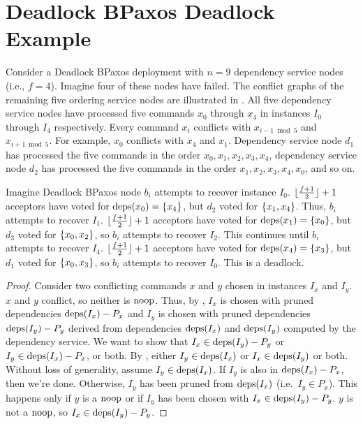 \section{Deadlock BPaxos Deadlock Example}
Consider a Deadlock BPaxos deployment with $n = 9$ dependency service nodes
(i.e., $f = 4$). Imagine four of these nodes have failed. The conflict graphs
of the remaining five ordering service nodes are illustrated in
. All five dependency service nodes have
processed five commands $x_0$ through $x_4$ in instances $I_0$ through $I_4$
respectively. Every command $x_i$ conflicts with $x_{i - 1 \bmod 5}$ and $x_{i
+ 1 \bmod 5}$. For example, $x_0$ conflicts with $x_4$ and $x_1$. Dependency
service node $d_1$ has processed the five commands in the order $x_0, x_1, x_2,
x_3, x_4$, dependency service node $d_2$ has processed the five commands in the
order $x_1, x_2, x_3, x_4, x_0$, and so on.

{}

Imagine Deadlock BPaxos node $b_i$ attempts to recover instance $I_0$.
$\lfloor\frac{f + 1}{2}\rfloor + 1$ acceptors have voted for $\text{deps}(x_0) = \{x_4\}$, but
$d_2$ voted for $\{x_1, x_4\}$. Thus, $b_i$ attempts to recover $I_1$.
$\lfloor\frac{f + 1}{2}\rfloor + 1$ acceptors have voted for $\text{deps}(x_1) = \{x_0\}$, but
$d_3$ voted for $\{x_0, x_2\}$, so $b_i$ attempts to recover $I_2$. This
continues until $b_i$ attempts to recover $I_4$.  $\lfloor\frac{f + 1}{2}\rfloor + 1$
acceptors have voted for $\text{deps}(x_4) = \{x_3\}$, but $d_1$ voted for
$\{x_0, x_3\}$, so $b_i$ attempts to recover $I_0$. This is a deadlock.


\begin{proof}
  Consider two conflicting commands $x$ and $y$ chosen in instances $I_x$ and
  $I_y$. $x$ and $y$ conflict, so neither is $\text{noop}$. Thus, by
  , $I_x$ is chosen with pruned dependencies
  $\text{deps}(I_x) - P_x$ and $I_y$ is chosen with pruned dependencies $\text{deps}(I_y) -
  P_y$ derived from dependencies $\text{deps}(I_x)$ and $\text{deps}(I_y)$ computed by the
  dependency service. We want to show that $I_x \in \text{deps}(I_y) - P_y$ or $I_y
  \in \text{deps}(I_x) - P_x$, or both.
  By , either $I_y \in \text{deps}(I_x)$ or $I_x \in
  \text{deps}(I_y)$ or both. Without loss of generality, assume $I_y \in \text{deps}(I_x)$.
  If $I_y$ is also in $\text{deps}(I_x) - P_x$, then we're done. Otherwise, $I_y$ has
  been pruned from $\text{deps}(I_x)$ (i.e.\ $I_y \in P_x$). This happens only if $y$
  is a $\text{noop}$ or if $I_y$ has been chosen with $I_x \in \text{deps}(I_y) - P_y$. $y$
  is not a $\text{noop}$, so $I_x \in \text{deps}(I_y) - P_y$.
\end{proof}

